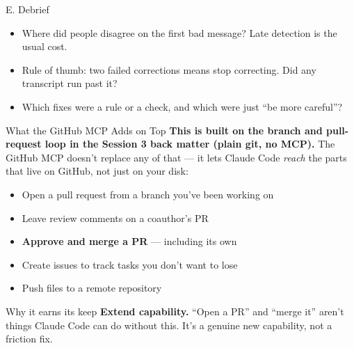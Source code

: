 \documentclass[aspectratio=169, 11pt]{beamer}
\begin{document}
\begin{frame}{E. Debrief}
  \begin{itemize}
    \item Where did people disagree on the first bad message? Late detection is the usual cost.
    \item Rule of thumb: two failed corrections means stop correcting. Did any transcript run past it?
    \item Which fixes were a rule or a check, and which were just ``be more careful''?
  \end{itemize}
  \vfill
  \hyperlink{backmatter}{}
\end{frame}


\begin{frame}[label=ghmcp]{What the GitHub MCP Adds on Top}
  \textbf{This is built on the branch and pull-request loop in the Session 3 back matter (plain git, no MCP).} The GitHub MCP doesn't replace any of that --- it lets Claude Code \emph{reach} the parts that live on GitHub, not just on your disk:

  \vspace{0.5em}
  \begin{itemize}
    \item Open a pull request from a branch you've been working on
    \item Leave review comments on a coauthor's PR
    \item \textbf{Approve and merge a PR} --- including its own
    \item Create issues to track tasks you don't want to lose
    \item Push files to a remote repository
  \end{itemize}

  \vspace{0.5em}
  \begin{block}{Why it earns its keep}
    \textbf{Extend capability.} ``Open a PR'' and ``merge it'' aren't things Claude Code can do without this. It's a genuine new capability, not a friction fix.
  \end{block}
\end{frame}
\end{document}
